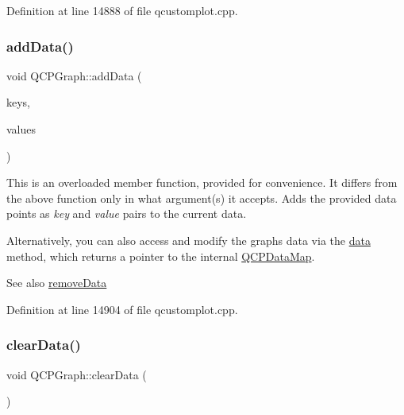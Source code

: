 Definition at line 14888 of file qcustomplot.\+cpp.

\mbox{\label{class_q_c_p_graph_ab6da6377541fe80d892a9893a92db9c6}} 
\subsubsection{\texorpdfstring{add\+Data()}{addData()}\hspace{0.1cm}{\footnotesize\ttfamily [4/4]}}
{\footnotesize\ttfamily void Q\+C\+P\+Graph\+::add\+Data (\begin{DoxyParamCaption}\item[{const Q\+Vector$<$ double $>$ \&}]{keys,  }\item[{const Q\+Vector$<$ double $>$ \&}]{values }\end{DoxyParamCaption})}

This is an overloaded member function, provided for convenience. It differs from the above function only in what argument(s) it accepts. Adds the provided data points as {\itshape key} and {\itshape value} pairs to the current data.

Alternatively, you can also access and modify the graph\textquotesingle{}s data via the \hyperlink{class_q_c_p_graph_acde1c0d1f6a817930489548396e6b3e6}{data} method, which returns a pointer to the internal \hyperlink{qcustomplot_8h_a84a9c4a4c2216ccfdcb5f3067cda76e3}{Q\+C\+P\+Data\+Map}.

\begin{DoxySeeAlso}{See also}
\hyperlink{class_q_c_p_graph_a4a0fde50b7db9db0a85b5c5b6b10098f}{remove\+Data} 
\end{DoxySeeAlso}


Definition at line 14904 of file qcustomplot.\+cpp.

\mbox{\label{class_q_c_p_graph_ad4e94a4e44e5e76fbec81a72a977157d}} 
\subsubsection{\texorpdfstring{clear\+Data()}{clearData()}}
{\footnotesize\ttfamily void Q\+C\+P\+Graph\+::clear\+Data (\begin{DoxyParamCaption}{ }\end{DoxyParamCaption})\hspace{0.3cm}{\ttfamily [virtual]}}

